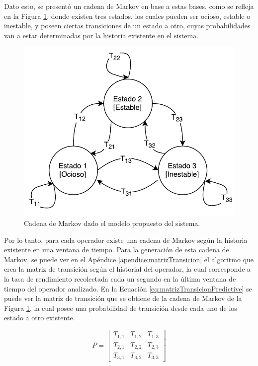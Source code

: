 Dato esto, se presentó un cadena de Markov en base a estas bases, como se refleja en la Figura \ref{fig:cadenaMarkovPredictiva}, donde existen tres estados, los cuales pueden ser ocioso, estable o inestable, y poseen ciertas transiciones de un estado a otro, cuyas probabilidades van a estar determinadas por la historia existente en el sistema.

\begin{figure}[hb!]
  \centering
    \includegraphics[scale=0.75]{images/CadenaMarkovPredictiva.pdf}
  \caption{Cadena de Markov dado el modelo propuesto del sistema.}
  \label{fig:cadenaMarkovPredictiva}
\end{figure}

Por lo tanto, para cada operador existe una cadena de Markov según la historia existente en una ventana de tiempo. Para la generación de esta cadena de Markov, se puede ver en el Apéndice \ref{apendice:matrizTransicion} el algoritmo que crea la matriz de transición según el historial del operador, la cual corresponde a la tasa de rendimiento recolectada cada un segundo en la última ventana de tiempo del operador analizado. En la Ecuación \ref{eq:matrizTransicionPredictive} se puede ver la matriz de transición que se obtiene de la cadena de Markov de la Figura \ref{fig:cadenaMarkovPredictiva}, la cual posee una probabilidad de transición desde cada uno de los estado a otro existente.

\begin{equation} \label{eq:matrizTransicionPredictive}
	P =
	\begin{bmatrix}
		T_{1,1} & T_{1,2} & T_{1,3} \\
		T_{2,1} & T_{2,2} & T_{2,3} \\
		T_{3,1} & T_{3,2} & T_{3,3}
	\end{bmatrix}	
\end{equation}

